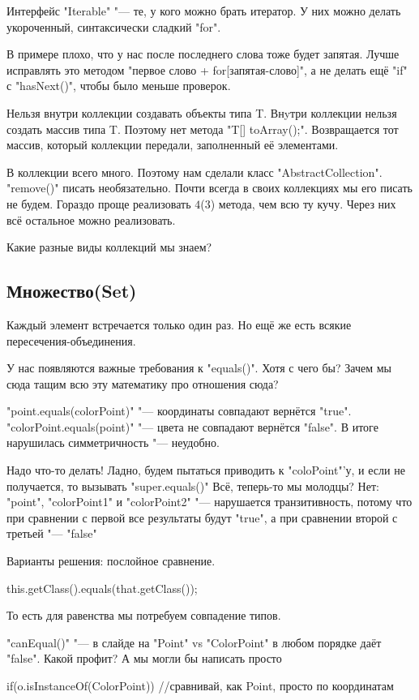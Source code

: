 Интерфейс \java"Iterable" "--- те, у кого можно брать итератор. У них можно делать укороченный, синтаксически сладкий \java"for".

В примере плохо, что у нас после последнего слова тоже будет запятая. Лучше исправлять это методом "первое слово + for[запятая-слово]",
а не делать ещё \java"if" с \java"hasNext()", чтобы было меньше проверок.

Нельзя внутри коллекции создавать объекты типа T. Внyтри коллекции нельзя создать массив типа T.
Поэтому нет метода \java"T[] toArray();". Возвращается тот массив, который коллекции передали, заполненный её элементами.

В коллекции всего много. Поэтому нам сделали класс \java"AbstractCollection". 
\java"remove()" писать необязательно. Почти всегда в своих коллекциях мы его писать не будем. 
Гораздо проще реализовать $4$($3$) метода, чем всю ту кучу. Через них всё остальное можно реализовать.


Какие разные виды коллекций мы знаем?

\subsection{Множество(Set)}
Каждый элемент встречается только один раз.
Но ещё же есть всякие пересечения-объединения. 

У нас появляются важные требования к \java"equals()". Хотя с чего бы? Зачем мы сюда тащим всю эту математику про отношения сюда?

\java"point.equals(colorPoint)" "--- координаты совпадают \rightarrow вернётся \java"true".
\java"colorPoint.equals(point)" "--- цвета не совпадают \rightarrow вернётся \java"false". 
В итоге нарушилась симметричность "--- неудобно.

Надо что-то делать! Ладно, будем пытаться приводить к \java"coloPoint"'у, и если не получается, то вызывать \java"super.equals()"
Всё, теперь-то мы молодцы? Нет: \java"point", \java"colorPoint1" и \java"colorPoint2" "--- нарушается транзитивность, 
потому что при сравнении с первой все результаты будут  \java"true", 
а при сравнении второй с третьей "--- \java"false"

Варианты решения: послойное сравнение.
\begin{javacode}
this.getClass().equals(that.getClass());
\end{javacode}
То есть для равенства мы потребуем совпадение типов.

\java"canEqual()" "--- в слайде на \java"Point" vs \java"ColorPoint" в любом порядке даёт \java"false". Какой профит? 
А мы могли бы написать просто 
\begin{javacode}
if(o.isInstanceOf(ColorPoint)) {
	//сравнивай, как Point, просто по координатам
}
\end{javacode}


